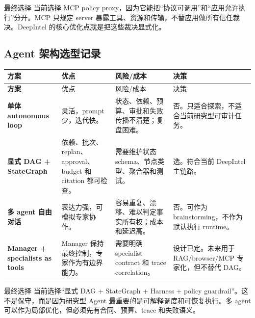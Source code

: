 \begin{analysisBox}{最终选择}
当前选择 MCP policy proxy，因为它能把“协议可调用”和“应用允许执行”分开。MCP 只规定 server 暴露工具、资源和传输，不替应用做所有信任裁决。DeepIntel 的核心优化点就是把这些裁决显式化。
\end{analysisBox}

\subsection{Agent 架构选型记录}
\begin{longtable}{>{\bfseries}p{}p{}p{}p{}}
\toprule
方案 & 优点 & 风险/成本 & 决策 \\
\midrule
\endfirsthead
\toprule
方案 & 优点 & 风险/成本 & 决策 \\
\midrule
\endhead
单体 autonomous loop & 灵活，prompt 少，迭代快。 & 状态、依赖、预算、审批和失败传播不清楚；复盘困难。 & 否。只适合探索，不适合当前研究型可审计任务。 \\
显式 DAG + StateGraph & 依赖、批次、replan、approval、budget 和 citation 都可检查。 & 需要维护状态 schema、节点类型、聚合器和测试。 & 选。符合当前 DeepIntel 主链路。 \\
多 agent 自由对话 & 表达力强，可模拟专家协作。 & 容易重复、漂移、难以判定事实所有权；成本和延迟高。 & 否。可作为 brainstorming，不作为默认执行 runtime。 \\
Manager + specialists as tools & Manager 保持最终控制，专家作为有边界能力。 & 需要明确 specialist contract 和 trace correlation。 & 设计已定。未来用于 RAG/browser/MCP 专家化，但不替代 DAG。 \\
\bottomrule
\end{longtable}

\begin{analysisBox}{最终选择}
当前选择“显式 DAG + StateGraph + Harness + policy guardrail”。这不是保守，而是因为研究型 Agent 最重要的是可解释调度和可恢复执行。多 agent 可以作为局部优化，但必须先有合同、预算、trace 和失败语义。
\end{analysisBox}

